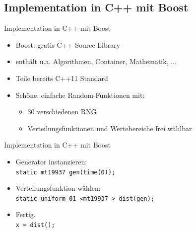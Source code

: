 \documentclass{beamer}
\begin{document}
\subsection[Boost]{Implementation in C++ mit Boost}
\begin{frame}{Implementation in C++ mit Boost}
	\begin{itemize}
		\item Boost: gratis C++ Source Library
		\item enthält u.a. Algorithmen, Container, Mathematik, ... 
		\item Teile bereits C++11 Standard
		\item Schöne, einfache Random-Funktionen mit:
		\begin{itemize}
			\item 30 verschiedenen RNG
			\item Verteilungsfunktionen und Wertebereiche frei wählbar
		\end{itemize}
	\end{itemize}
\end{frame}
\begin{frame}{Implementation in C++ mit Boost}
	\begin{itemize}
		\item Generator instanzieren: \\
			\texttt{static mt19937 gen(time(0));}
		\item Verteilungsfunktion wählen: \\
			\texttt{static uniform\_01 <mt19937 > dist(gen);}
		\item Fertig. \\
			\texttt{x = dist();}
	\end{itemize}
\end{frame}
\end{document}

